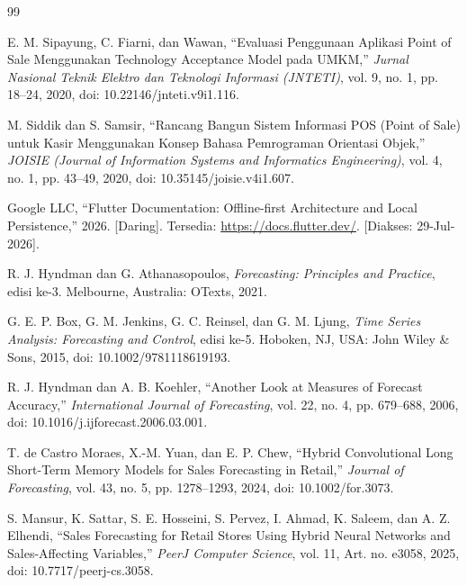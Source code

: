 \documentclass[10pt,a4paper]{article}
\begin{document}
\begingroup
\renewcommand{\section}[2]{}%
\begin{thebibliography}{99}
\fontsize{8pt}{10pt}\selectfont
\setlength{\itemsep}{1.5pt}
\setlength{\parskip}{0pt}

E. M. Sipayung, C. Fiarni, dan Wawan, ``Evaluasi Penggunaan Aplikasi Point of Sale Menggunakan Technology Acceptance Model pada UMKM,'' \textit{Jurnal Nasional Teknik Elektro dan Teknologi Informasi (JNTETI)}, vol. 9, no. 1, pp. 18--24, 2020, doi: 10.22146/jnteti.v9i1.116.

M. Siddik dan S. Samsir, ``Rancang Bangun Sistem Informasi POS (Point of Sale) untuk Kasir Menggunakan Konsep Bahasa Pemrograman Orientasi Objek,'' \textit{JOISIE (Journal of Information Systems and Informatics Engineering)}, vol. 4, no. 1, pp. 43--49, 2020, doi: 10.35145/joisie.v4i1.607.

Google LLC, ``Flutter Documentation: Offline-first Architecture and Local Persistence,'' 2026. [Daring]. Tersedia: \url{https://docs.flutter.dev/}. [Diakses: 29-Jul-2026].

R. J. Hyndman dan G. Athanasopoulos, \textit{Forecasting: Principles and Practice}, edisi ke-3. Melbourne, Australia: OTexts, 2021.

G. E. P. Box, G. M. Jenkins, G. C. Reinsel, dan G. M. Ljung, \textit{Time Series Analysis: Forecasting and Control}, edisi ke-5. Hoboken, NJ, USA: John Wiley \& Sons, 2015, doi: 10.1002/9781118619193.

R. J. Hyndman dan A. B. Koehler, ``Another Look at Measures of Forecast Accuracy,'' \textit{International Journal of Forecasting}, vol. 22, no. 4, pp. 679--688, 2006, doi: 10.1016/j.ijforecast.2006.03.001.

T. de Castro Moraes, X.-M. Yuan, dan E. P. Chew, ``Hybrid Convolutional Long Short-Term Memory Models for Sales Forecasting in Retail,'' \textit{Journal of Forecasting}, vol. 43, no. 5, pp. 1278--1293, 2024, doi: 10.1002/for.3073.

S. Mansur, K. Sattar, S. E. Hosseini, S. Pervez, I. Ahmad, K. Saleem, dan A. Z. Elhendi, ``Sales Forecasting for Retail Stores Using Hybrid Neural Networks and Sales-Affecting Variables,'' \textit{PeerJ Computer Science}, vol. 11, Art. no. e3058, 2025, doi: 10.7717/peerj-cs.3058.


\end{thebibliography}
\end{document}
